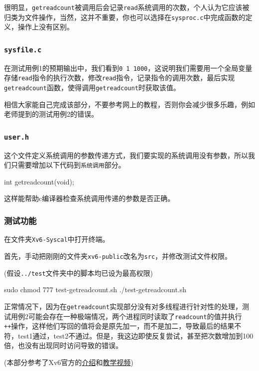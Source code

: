 \documentclass[
]{article}
\newenvironment{Shaded}{}{}
\newcommand{\DataTypeTok}[1]{\textcolor[rgb]{0.56,0.13,0.00}{#1}}
\newcommand{\ExtensionTok}[1]{#1}
\newcommand{\FunctionTok}[1]{\textcolor[rgb]{0.02,0.16,0.49}{#1}}
\newcommand{\NormalTok}[1]{#1}
\newcommand{\OperatorTok}[1]{\textcolor[rgb]{0.40,0.40,0.40}{#1}}
\begin{document}
很明显，\texttt{getreadcount}被调用后会记录\texttt{read}系统调用的次数，个人认为它应该被归类为文件操作，当然，这并不重要，你也可以选择在\texttt{sysproc.c}中完成函数的定义，操作上没有区别。

\subsubsection{\texorpdfstring{\texttt{sysfile.c}}{sysfile.c}}\label{sysfilec}

在测试用例1的预期输出中，我们看到\texttt{0\ 1\ 1000}，这说明我们需要用一个全局变量存储\texttt{read}指令的执行次数，修改\texttt{read}指令，记录指令的调用次数，最后实现\texttt{getreadcount}函数，使得调用\texttt{getreadcount}时获取该值。

相信大家能自己完成该部分，不要参考网上的教程，否则你会减少很多乐趣，例如老师提到的测试用例2的错误。

\subsubsection{\texorpdfstring{\texttt{user.h}}{user.h}}\label{userh}

这个文件定义系统调用的参数传递方式，我们要实现的系统调用没有参数，所以我们只需要增加以下代码到\texttt{系统调用}部分。

\begin{Shaded}
	\begin{Highlighting}[]
		\DataTypeTok{int}\NormalTok{ getreadcount}\OperatorTok{(}\DataTypeTok{void}\OperatorTok{);}
	\end{Highlighting}
\end{Shaded}

这样能帮助c编译器检查系统调用传递的参数是否正确。

\subsubsection{测试功能}\label{ux6d4bux8bd5ux529fux80fd}

在文件夹\texttt{Xv6-Syscal}中打开终端。

首先，手动把刚刚的文件夹\texttt{xv6-public}改名为\texttt{src}，并修改测试文件权限。

(假设\texttt{../test}文件夹中的脚本均已设为最高权限)

\begin{Shaded}
	\begin{Highlighting}[]
		\FunctionTok{sudo}\NormalTok{ chmod 777 test{-}getreadcount.sh}
		\ExtensionTok{./test{-}getreadcount.sh}
	\end{Highlighting}
\end{Shaded}

正常情况下，因为在\texttt{getreadcount}实现部分没有对多线程进行针对性的处理，测试用例2可能会存在一种极端情况，两个进程同时读取了\texttt{readcount}的值并执行\texttt{++}操作，这样他们写回的值将会是原先加一，而不是加二，导致最后的结果不符，test1通过，test2不通过。但是，我这边即使反复尝试，甚至把次数增加到100倍，也没有出现同时访问导致的错误。

(本部分参考了Xv6官方的\href{https://github.com/remzi-arpacidusseau/ostep-projects/tree/master/initial-xv6}{介绍}和\href{https://www.bilibili.com/video/BV1mJ4m1777o/}{教学视频})
\end{document}
